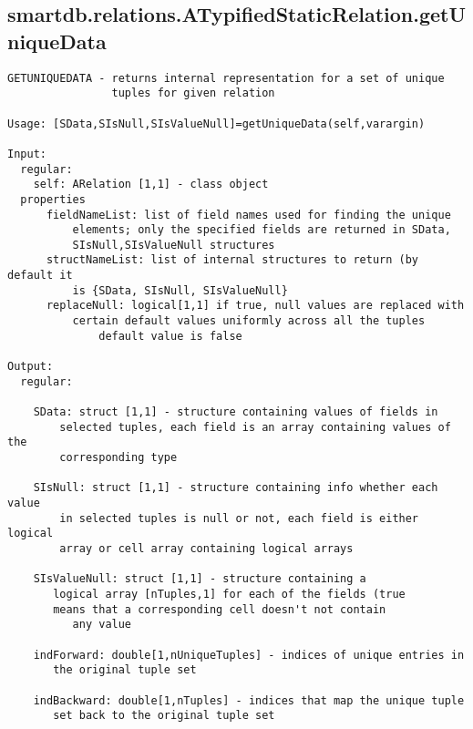 \subsection{\texorpdfstring{smartdb.relations.ATypifiedStaticRelation.getUniqueData}{getUniqueData}}\label{method:smartdb.relations.ATypifiedStaticRelation.getUniqueData}
\begin{verbatim}
GETUNIQUEDATA - returns internal representation for a set of unique
                tuples for given relation

Usage: [SData,SIsNull,SIsValueNull]=getUniqueData(self,varargin)

Input:
  regular:
    self: ARelation [1,1] - class object
  properties
      fieldNameList: list of field names used for finding the unique
          elements; only the specified fields are returned in SData,
          SIsNull,SIsValueNull structures
      structNameList: list of internal structures to return (by default it
          is {SData, SIsNull, SIsValueNull}
      replaceNull: logical[1,1] if true, null values are replaced with
          certain default values uniformly across all the tuples
              default value is false

Output:
  regular:

    SData: struct [1,1] - structure containing values of fields in
        selected tuples, each field is an array containing values of the
        corresponding type

    SIsNull: struct [1,1] - structure containing info whether each value
        in selected tuples is null or not, each field is either logical
        array or cell array containing logical arrays

    SIsValueNull: struct [1,1] - structure containing a
       logical array [nTuples,1] for each of the fields (true
       means that a corresponding cell doesn't not contain
          any value

    indForward: double[1,nUniqueTuples] - indices of unique entries in
       the original tuple set

    indBackward: double[1,nTuples] - indices that map the unique tuple
       set back to the original tuple set
\end{verbatim}
